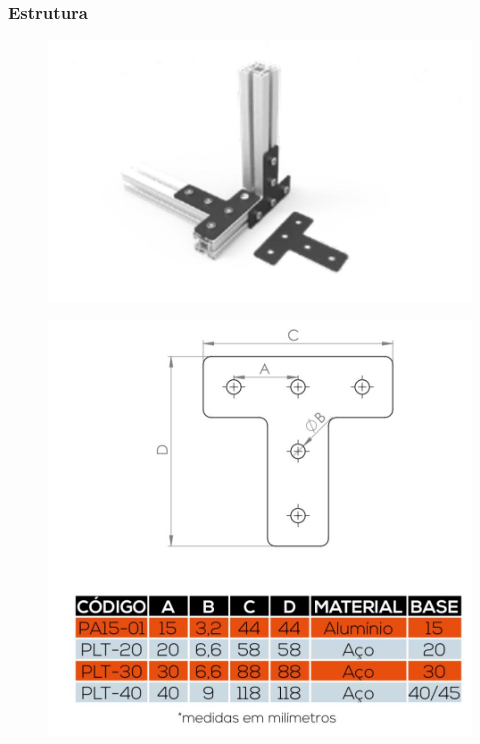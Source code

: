 \begin{frame}
\frametitle{Estrutura}

\begin{figure}
\centering
\includegraphics[scale = 0.10]{figs/placatp}
\end{figure}

\begin{figure}
\centering
\includegraphics[scale = 0.10]{figs/placatd}
\end{figure}
    
\end{frame}

